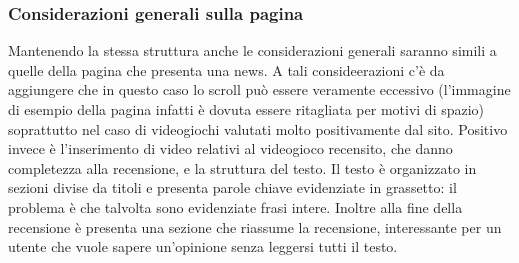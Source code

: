 \documentclass[../ProgettoTecWeb2.tex]{subfiles}
\begin{document}
		\subsubsection{Considerazioni generali sulla pagina}
		Mantenendo la stessa struttura anche le considerazioni generali saranno simili a quelle della pagina che presenta una news. A tali consideerazioni c'è da aggiungere che in questo caso lo scroll può essere veramente eccessivo (l'immagine di esempio della pagina infatti è dovuta essere ritagliata per motivi di spazio) soprattutto nel caso di videogiochi valutati molto positivamente dal sito. Positivo invece è l'inserimento di video relativi al videogioco recensito, che danno completezza alla recensione, e la struttura del testo. Il testo è organizzato in sezioni divise da titoli e presenta parole chiave evidenziate in grassetto: il problema è che talvolta sono evidenziate frasi intere. Inoltre alla fine della recensione è presenta una sezione che riassume la recensione, interessante per un utente che vuole sapere un'opinione senza leggersi tutti il testo.
\end{document}

